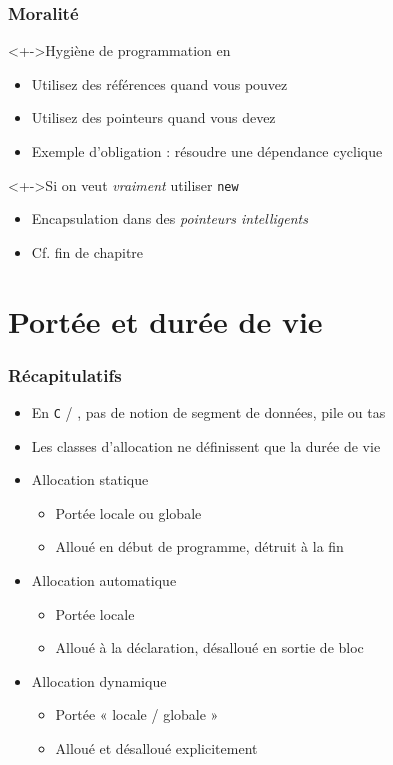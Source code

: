\begin{frame}
\frametitle{Moralité}
\begin{block}<+->{Hygiène de programmation en \cpp}
	\begin{itemize}[<+->]
	\item Utilisez des références quand vous pouvez
	\item Utilisez des pointeurs quand vous devez
	\end{itemize}
\end{block}
\begin{itemize}[<+->]
\item Exemple d'obligation : résoudre une dépendance cyclique
\end{itemize}
\begin{exampleblock}<+->{Si on veut \emph{vraiment} utiliser \texttt{new}}
	\begin{itemize}[<+->]
	\item Encapsulation dans des \emph{pointeurs intelligents}
	\end{itemize}
\end{exampleblock}
\begin{itemize}[<+->]
\item Cf. fin de chapitre
\end{itemize}
\end{frame}

\section{Portée et durée de vie}

\begin{frame}
\frametitle{Récapitulatifs}
\begin{itemize}[<+->]
\item En \texttt{C} / \cpp, pas de notion de segment de données, pile ou tas
\item Les classes d'allocation ne définissent que la durée de vie
\item Allocation statique
	\begin{itemize}[<+->]
	\item Portée locale ou globale
	\item Alloué en début de programme, détruit à la fin
	\end{itemize}
\item Allocation automatique
	\begin{itemize}
	\item Portée locale
	\item Alloué à la déclaration, désalloué en sortie de bloc
	\end{itemize}
\item Allocation dynamique
	\begin{itemize}
	\item Portée « locale / globale »
	\item Alloué et désalloué explicitement
	\end{itemize}
\end{itemize}
\end{frame}

